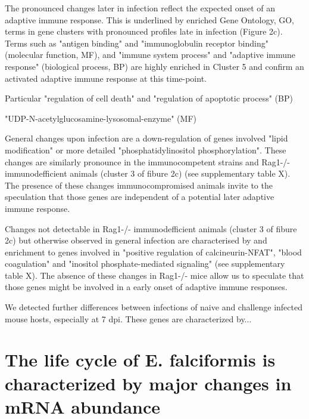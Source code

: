 \documentclass{bmcart}
\begin{document}
The pronounced changes later in infection reflect the expected
onset of an adaptive immune response. This is underlined by enriched Gene Ontology, GO, terms
in gene clusters with pronounced profiles late in infection (Figure 2c). Terms such as "antigen binding" and "immunoglobulin receptor binding" (molecular function, MF), and "immune system process" and "adaptive immune
response" (biological process, BP) are highly enriched in Cluster 5 and confirm an activated adaptive immune response
at this time-point. 

Particular "regulation of cell death" and "regulation of apoptotic process" (BP)

"UDP-N-acetylglucosamine-lysosomal-enzyme" (MF)


General changes upon infection are a down-regulation of genes involved
"lipid modification" or more detailed "phosphatidylinositol
phosphorylation". These changes are similarly pronounce in the
immunocompetent strains and Rag1-/- immunodefficient animals (cluster 3
of fibure 2c) (see supplementary table X).  The presence of these
changes immunocompromised animals invite to the speculation that those
genes are independent of a potential later adaptive immune response.

Changes not detectable in Rag1-/- immunodefficient animals (cluster 3
of fibure 2c) but otherwise observed in general infection are
characterised by and enrichment to genes involved in "positive
regulation of calcineurin-NFAT", "blood coagulation" and "inositol
phosphate-mediated signaling" (see supplementary table X). The
absence of these changes in Rag1-/- mice allow us to speculate that
those genes might be involved in a early onset of adaptive
immune responses.



We detected further differences between infections of naive and
challenge infected mouse hosts, especially at 7 dpi. These genes are
characterized by...

\section*{The life cycle of E. falciformis is characterized by major changes in mRNA abundance}
\end{document}
